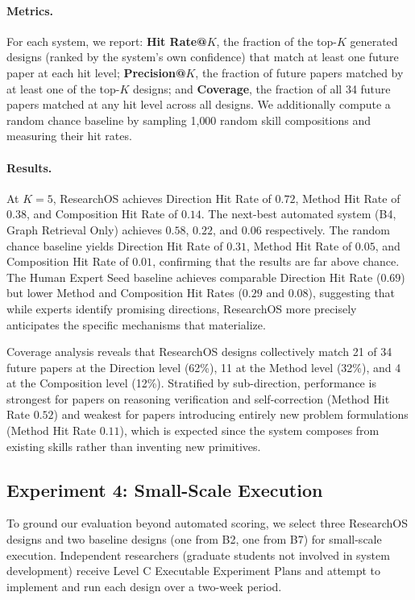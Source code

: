\paragraph{Metrics.}
For each system, we report: \textbf{Hit Rate@$K$}, the fraction of the top-$K$ generated designs (ranked by the system's own confidence) that match at least one future paper at each hit level; \textbf{Precision@$K$}, the fraction of future papers matched by at least one of the top-$K$ designs; and \textbf{Coverage}, the fraction of all 34 future papers matched at any hit level across all designs. We additionally compute a random chance baseline by sampling 1{,}000 random skill compositions and measuring their hit rates.

\paragraph{Results.}
At $K = 5$, ResearchOS achieves Direction Hit Rate of $0.72$, Method Hit Rate of $0.38$, and Composition Hit Rate of $0.14$. The next-best automated system (B4, Graph Retrieval Only) achieves $0.58$, $0.22$, and $0.06$ respectively. The random chance baseline yields Direction Hit Rate of $0.31$, Method Hit Rate of $0.05$, and Composition Hit Rate of $0.01$, confirming that the results are far above chance. The Human Expert Seed baseline achieves comparable Direction Hit Rate ($0.69$) but lower Method and Composition Hit Rates ($0.29$ and $0.08$), suggesting that while experts identify promising directions, ResearchOS more precisely anticipates the specific mechanisms that materialize.

Coverage analysis reveals that ResearchOS designs collectively match 21 of 34 future papers at the Direction level (62\%), 11 at the Method level (32\%), and 4 at the Composition level (12\%). Stratified by sub-direction, performance is strongest for papers on reasoning verification and self-correction (Method Hit Rate $0.52$) and weakest for papers introducing entirely new problem formulations (Method Hit Rate $0.11$), which is expected since the system composes from existing skills rather than inventing new primitives.


\subsection{Experiment 4: Small-Scale Execution}
\label{subsec:execution}

To ground our evaluation beyond automated scoring, we select three ResearchOS designs and two baseline designs (one from B2, one from B7) for small-scale execution. Independent researchers (graduate students not involved in system development) receive Level C Executable Experiment Plans and attempt to implement and run each design over a two-week period.


